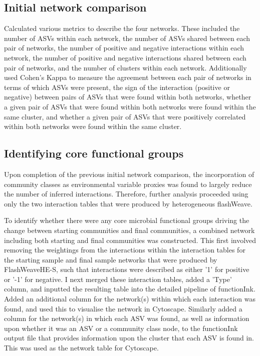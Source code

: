 \documentclass[11pt]{article}
\begin{document}
\subsection{Initial network comparison}
Calculated various metrics to describe the four networks. These included the number of ASVs within each network, the number of ASVs shared between each pair of networks, the number of positive and negative interactions within each network, the number of positive and negative interactions shared between each pair of networks, and the number of clusters within each network. Additionally used Cohen's Kappa to measure the agreement between each pair of networks in terms of which ASVs were present, the sign of the interaction (positive or negative) between pairs of ASVs that were found within both networks, whether a given pair of ASVs that were found within both networks were found within the same cluster, and whether a given pair of ASVs that were positively correlated within both networks were found within the same cluster.

\subsection{Identifying core functional groups}
Upon completion of the previous initial network comparison, the incorporation of community classes as environmental variable proxies was found to largely reduce the number of inferred interactions. Therefore, further analysis proceeded using only the two interaction tables that were produced by heterogeneous flashWeave. 

To identify whether there were any core microbial functional groups driving the change between starting communities and final communities, a combined network including both starting and final communities was constructed. This first involved removing the weightings from the interactions within the interaction tables for the starting sample and final sample networks that were produced by FlashWeaveHE-S, such that interactions were described as either '1' for positive or '-1' for negative. I next merged these interaction tables, added a 'Type' column, and inputted the resulting table into the detailed pipeline of functionInk. Added an additional column for the network(s) within which each interaction was found, and used this to visualise the network in Cytoscape. Similarly added a column for the network(s) in which each ASV was found, as well as information upon whether it was an ASV or a community class node, to the functionInk output file that provides information upon the cluster that each ASV is found in. This was used as the network table for Cytoscape.
\end{document}
